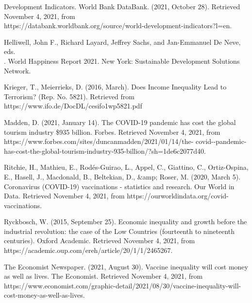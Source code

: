 \documentclass[fontsize=11pt]{article}
\begin{document}
    \item Development Indicators. World Bank DataBank. (2021, October 28). Retrieved November 4, 2021, from \\ \indent https://databank.worldbank.org/source/world-development-indicators?l=en. \\

    \item Helliwell, John F., Richard Layard, Jeffrey Sachs, and Jan-Emmanuel De Neve, eds.
    \\ . World Happiness Report 2021. New York: Sustainable Development Solutions Network. \\

    \item Krieger, T.,  Meierrieks, D. (2016, March).  Does Income Inequality Lead to Terrorism?  (Rep.  No.  5821). Retrieved \indent from https://www.ifo.de/DocDL/cesifo1wp5821.pdf \\

    \item Madden, D. (2021, January 14). The COVID-19 pandemic has cost the global tourism industry \$935 billion. \indent Forbes. Retrieved November 4, 2021, from https://www.forbes.com/sites/duncanmadden/2021/01/14/the- covid--pandemic-has-cost-the-global-tourism-industry-935-billion/?sh=1de6c2077d40. \\

    \item Ritchie, H., Mathieu, E., Rodés-Guirao, L., Appel, C., Giattino, C., Ortiz-Ospina, E., Hasell, J., Macdonald, B., \indent Beltekian, D., &amp; Roser, M. (2020, March 5). Coronavirus (COVID-19) vaccinations - statistics and research. \indent Our World in Data. Retrieved November 4, 2021, from https://ourworldindata.org/covid-vaccinations. \\

    \item Ryckbosch, W. (2015, September 25). Economic inequality and growth before the industrial revolution: the case \indent of the Low Countries (fourteenth to nineteenth centuries). Oxford Academic. Retrieved November 4, 2021, from \indent https://academic.oup.com/ereh/article/20/1/1/2465267. \\

    \item The Economist Newspaper. (2021, August 30). Vaccine inequality will cost money as well as lives. The Economist. \indent Retrieved November 4, 2021, from https://www.economist.com/graphic-detail/2021/08/30/vaccine-inequality-\indent will-cost-money-as-well-as-lives. \\
\end{document}
